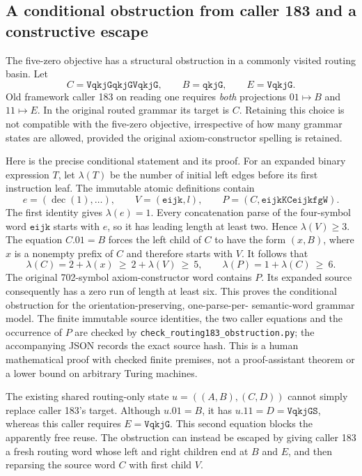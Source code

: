 \subsection{A conditional obstruction from caller 183 and a constructive escape}
The five-zero objective has a structural obstruction in a commonly visited
routing basin.  Let
\[
 C=\mathtt{VqkjGqkjGVqkjG},\qquad B=\mathtt{qkjG},\qquad
 E=\mathtt{VqkjG}.
\]
Old framework caller 183 on reading one requires \emph{both} projections
$01\mapsto B$ and $11\mapsto E$.  In the original routed grammar its target
is $C$.  Retaining this choice is not compatible with the five-zero
objective, irrespective of how many grammar states are allowed, provided
the original axiom-constructor spelling is retained.

Here is the precise conditional statement and its proof.  For an expanded
binary expression $T$, let $\lambda(T)$ be the number of initial left
edges before its first instruction leaf.  The immutable atomic definitions
contain
\[
 e=(\operatorname{dec}(1),\ldots),\qquad
 V=(\mathtt{eijk},l),\qquad P=(C,\mathtt{eijkKCeijkfgW}).
\]
The first identity gives $\lambda(e)=1$.  Every concatenation parse of the
four-symbol word $\mathtt{eijk}$ starts with $e$, so it has leading length
at least two.  Hence $\lambda(V)\geq3$.  The equation $C.01=B$ forces the
left child of $C$ to have the form $(x,B)$, where $x$ is a nonempty prefix
of $C$ and therefore starts with $V$.  It follows that
\[
 \lambda(C)=2+\lambda(x)\ \geq\ 2+\lambda(V)\ \geq\ 5,
 \qquad \lambda(P)=1+\lambda(C)\ \geq\ 6.
\]
The original 702-symbol axiom-constructor word contains $P$.  Its expanded
source consequently has a zero run of length at least six.  This proves
the conditional obstruction for the orientation-preserving, one-parse-per-
semantic-word grammar model.  The finite immutable source identities,
the two caller equations and the occurrence of $P$ are checked by
\texttt{check\_routing183\_obstruction.py}; the accompanying JSON records
the exact source hash.  This is a human mathematical proof with checked
finite premises, not a proof-assistant theorem or a lower bound on
arbitrary Turing machines.

The existing shared routing-only state $u=((A,B),(C,D))$ cannot simply
replace caller 183's target.  Although $u.01=B$, it has
$u.11=D=\mathtt{VqkjGS}$, whereas this caller requires
$E=\mathtt{VqkjG}$.  This second equation blocks the apparently free reuse.
The obstruction can instead be escaped by giving caller 183 a fresh
routing word whose left and right children end at $B$ and $E$, and then
reparsing the source word $C$ with first child $V$.

